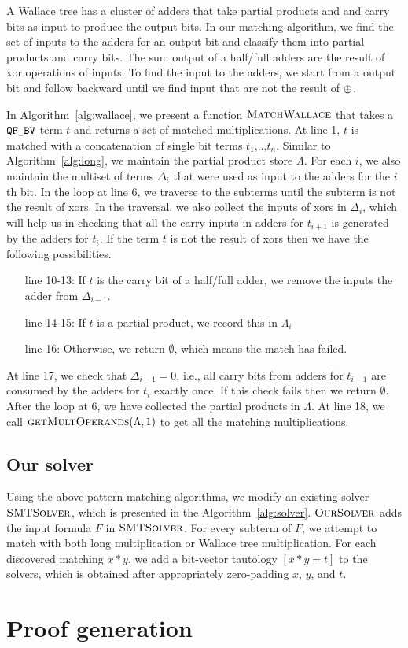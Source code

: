 A Wallace tree has a cluster of adders that take partial products and 
and carry bits as input to produce the output bits.
%
In our matching algorithm, we find the set of inputs
to the adders for an output bit and classify them into
partial products and carry bits.
%
The sum output of a half/full adders are the result of 
xor operations of inputs.
%
To find the input to the adders, we start from a
output bit and follow backward until we find input that
are not the result of $\oplus$.

In Algorithm~\ref{alg:wallace}, we present a function
$\textsc{MatchWallace}$ that takes a $\texttt{QF\_BV}$ term $t$ and returns a
set of matched multiplications.
%
At line 1, $t$ is matched with a concatenation of single bit terms $t_1$,..,$t_n$.
%
Similar to Algorithm~\ref{alg:long},
we maintain the partial product store $\Lambda$.
%
For each $i$,
we also maintain the multiset of terms $\Delta_i$ that were used as 
input to the adders for the $i$th bit.
%
In the loop at line 6, we traverse to the subterms until
the subterm is not the result of xors.
%
In the traversal, we also collect the inputs of xors in $\Delta_i$, which
will help us in checking that all the carry inputs in adders for $t_{i+1}$
is generated by the adders for $t_i$.
%
If the term $t$ is not the result of xors then
we have the following possibilities.
%
\begin{itemize}
\item[line 10-13:]
  If $t$ is the carry bit of a half/full adder, we remove the inputs 
  the adder from $\Delta_{i-1}$.
\item[line 14-15:] If $t$ is a partial product, we record this in $\Lambda_i$
\item[line 16:] Otherwise, we return $\emptyset$, which means the match has failed.
\end{itemize}
At line 17, we check that $\Delta_{i-1} = 0$, i.e., all carry bits from
adders for $t_{i-1}$ are consumed by the adders for $t_i$ exactly once.
%
If this check fails then we return $\emptyset$.
%
After the loop at 6, we have collected the partial products in $\Lambda$.
%
At line 18, we call $\textsc{getMultOperands}(\Lambda,1)$ to get all
the matching multiplications.

\subsection{Our solver}


Using the above pattern matching algorithms, we modify an existing
solver $\textsc{SMTSolver}$, which
is presented in the Algorithm~\ref{alg:solver}.
%
$\textsc{OurSolver}$ adds the input formula $F$ in $\textsc{SMTSolver}$.
%
For every subterm of $F$, we attempt to match with both long multiplication
or Wallace tree multiplication.
%
For each discovered matching $x*y$, we add a bit-vector tautology $[x*y = t]$ 
to the solvers, which is obtained after
appropriately zero-padding $x$, $y$, and $t$.
 


\section{Proof generation}


